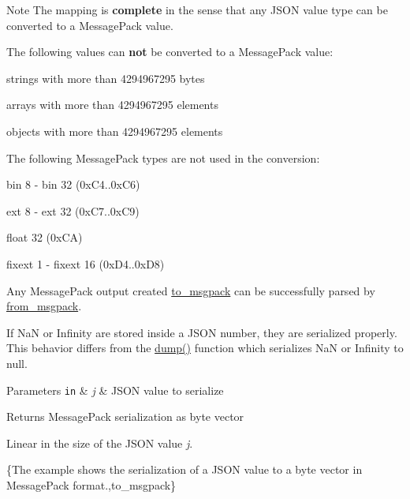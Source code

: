 \begin{DoxyNote}{Note}
The mapping is {\bfseries complete} in the sense that any J\+S\+ON value type can be converted to a Message\+Pack value.

The following values can {\bfseries not} be converted to a Message\+Pack value\+:
\begin{DoxyItemize}
\item strings with more than 4294967295 bytes
\item arrays with more than 4294967295 elements
\item objects with more than 4294967295 elements
\end{DoxyItemize}

The following Message\+Pack types are not used in the conversion\+:
\begin{DoxyItemize}
\item bin 8 -\/ bin 32 (0x\+C4..0x\+C6)
\item ext 8 -\/ ext 32 (0x\+C7..0x\+C9)
\item float 32 (0x\+CA)
\item fixext 1 -\/ fixext 16 (0x\+D4..0x\+D8)
\end{DoxyItemize}

Any Message\+Pack output created \mbox{\hyperlink{classnlohmann_1_1basic__json_a09ca1dc273d226afe0ca83a9d7438d9c}{to\+\_\+msgpack}} can be successfully parsed by \mbox{\hyperlink{classnlohmann_1_1basic__json_a11458b7982adba51bc634f2f8c961e9b}{from\+\_\+msgpack}}.

If NaN or Infinity are stored inside a J\+S\+ON number, they are serialized properly. This behavior differs from the \mbox{\hyperlink{classnlohmann_1_1basic__json_a50ec80b02d0f3f51130d4abb5d1cfdc5}{dump()}} function which serializes NaN or Infinity to {\ttfamily null}.
\end{DoxyNote}

\begin{DoxyParams}[1]{Parameters}
\mbox{\tt in}  & {\em j} & J\+S\+ON value to serialize \\
\hline
\end{DoxyParams}
\begin{DoxyReturn}{Returns}
Message\+Pack serialization as byte vector
\end{DoxyReturn}
Linear in the size of the J\+S\+ON value {\itshape j}.

\{The example shows the serialization of a J\+S\+ON value to a byte vector in Message\+Pack format.,to\+\_\+msgpack\}

